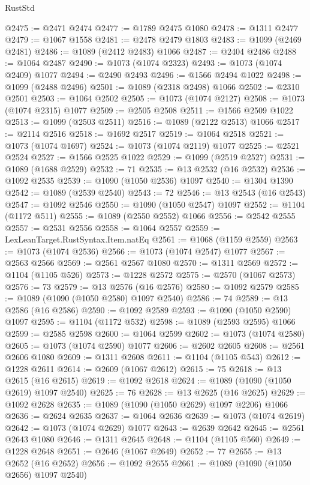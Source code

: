 \begin{lexlean}{RustStd}
\begin{coremodule}
@2475 := @2471 @2474
@2477 := @1789 @2475 @1080
@2478 := @1311 @2477
@2479 := @1067 @1558
@2481 := @2478 @2479 @1803
@2483 := @1099 (@2469 @2481)
@2486 := @1089 (@2412 @2483) @1066
@2487 := @2404 @2486
@2488 := @1064 @2487
@2490 := @1073 (@1074 @2323)
@2493 := @1073 (@1074 @2409) @1077
@2494 := @2490 @2493
@2496 := @1566 @2494 @1022
@2498 := @1099 (@2488 @2496)
@2501 := @1089 (@2318 @2498) @1066
@2502 := @2310 @2501
@2503 := @1064 @2502
@2505 := @1073 (@1074 @2127)
@2508 := @1073 (@1074 @2315) @1077
@2509 := @2505 @2508
@2511 := @1566 @2509 @1022
@2513 := @1099 (@2503 @2511)
@2516 := @1089 (@2122 @2513) @1066
@2517 := @2114 @2516
@2518 := @1692 @2517
@2519 := @1064 @2518
@2521 := @1073 (@1074 @1697)
@2524 := @1073 (@1074 @2119) @1077
@2525 := @2521 @2524
@2527 := @1566 @2525 @1022
@2529 := @1099 (@2519 @2527)
@2531 := @1089 (@1688 @2529)
@2532 := 71
@2535 := @13 @2532 (@16 @2532)
@2536 := @1092 @2535
@2539 := @1090 (@1050 @2536) @1097
@2540 := @1304 @1390
@2542 := @1089 (@2539 @2540)
@2543 := 72
@2546 := @13 @2543 (@16 @2543)
@2547 := @1092 @2546
@2550 := @1090 (@1050 @2547) @1097
@2552 := @1104 (@1172 @511)
@2555 := @1089 (@2550 @2552) @1066
@2556 := @2542 @2555
@2557 := @2531 @2556
@2558 := @1064 @2557
@2559 := LexLeanTarget.RustSyntax.Item.natEq
@2561 := @1068 (@1159 @2559)
@2563 := @1073 (@1074 @2536)
@2566 := @1073 (@1074 @2547) @1077
@2567 := @2563 @2566
@2569 := @2561 @2567 @1080
@2570 := @1311 @2569
@2572 := @1104 (@1105 @526)
@2573 := @1228 @2572
@2575 := @2570 (@1067 @2573)
@2576 := 73
@2579 := @13 @2576 (@16 @2576)
@2580 := @1092 @2579
@2585 := @1089 (@1090 (@1050 @2580) @1097 @2540)
@2586 := 74
@2589 := @13 @2586 (@16 @2586)
@2590 := @1092 @2589
@2593 := @1090 (@1050 @2590) @1097
@2595 := @1104 (@1172 @532)
@2598 := @1089 (@2593 @2595) @1066
@2599 := @2585 @2598
@2600 := @1064 @2599
@2602 := @1073 (@1074 @2580)
@2605 := @1073 (@1074 @2590) @1077
@2606 := @2602 @2605
@2608 := @2561 @2606 @1080
@2609 := @1311 @2608
@2611 := @1104 (@1105 @543)
@2612 := @1228 @2611
@2614 := @2609 (@1067 @2612)
@2615 := 75
@2618 := @13 @2615 (@16 @2615)
@2619 := @1092 @2618
@2624 := @1089 (@1090 (@1050 @2619) @1097 @2540)
@2625 := 76
@2628 := @13 @2625 (@16 @2625)
@2629 := @1092 @2628
@2635 := @1089 (@1090 (@1050 @2629) @1097 @2206) @1066
@2636 := @2624 @2635
@2637 := @1064 @2636
@2639 := @1073 (@1074 @2619)
@2642 := @1073 (@1074 @2629) @1077
@2643 := @2639 @2642
@2645 := @2561 @2643 @1080
@2646 := @1311 @2645
@2648 := @1104 (@1105 @560)
@2649 := @1228 @2648
@2651 := @2646 (@1067 @2649)
@2652 := 77
@2655 := @13 @2652 (@16 @2652)
@2656 := @1092 @2655
@2661 := @1089 (@1090 (@1050 @2656) @1097 @2540)

\end{coremodule}
\end{lexlean}
